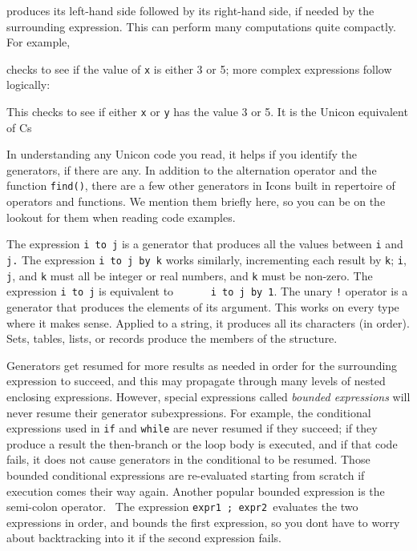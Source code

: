 
\noindent
produces its left-hand side followed by its right-hand side, if needed
by the surrounding expression. This can perform many computations quite
compactly. For example,


checks to see if the value of \texttt{x} is either 3 or 5; more complex
expressions follow logically:


This checks to see if either \texttt{x} or \texttt{y} has the value 3 or
5. It is the Unicon equivalent of C{\textquotesingle}s


In understanding any Unicon code you read, it helps if you identify the
generators, if there are any. In addition to the alternation operator
\texttt{{\textbar}} and the function \texttt{find()}, there are a few
other generators in Icon{\textquotesingle}s built in repertoire of
operators and functions. We mention them briefly here, so you can be on
the lookout for them when reading code examples.

The expression \texttt{i }\texttt{to j} is a
generator that produces all the values between \texttt{i} and
\texttt{j.} The expression \texttt{i to j }\texttt{by k} works similarly, incrementing each result by
\texttt{k}; \texttt{i}, \texttt{j}, and \texttt{k} must all be integer
or real numbers, and \texttt{k} must be non-zero. The expression
\texttt{i to j} is equivalent to \ \ \ \ \ \ \texttt{i to j by 1}. The
unary \texttt{!} operator is a generator
that produces the elements of its argument. This works on every type
where it makes sense. Applied to a string, it produces all its
characters (in order). Sets, tables, lists, or records produce the
members of the structure.

Generators get resumed for more results as needed in order for the
surrounding expression to succeed, and this may propagate through many
levels of nested enclosing expressions. However, special expressions
called \textit{bounded expressions} will
never resume their generator subexpressions. For example, the
conditional expressions used in \texttt{if} and \texttt{while} are
never resumed if they succeed; if they produce a result the then-branch
or the loop body is executed, and if that code fails, it does not cause
generators in the conditional to be resumed. Those bounded conditional
expressions are re-evaluated starting from scratch if execution comes
their way again. Another popular bounded expression is the semi-colon
operator. \ The expression \texttt{expr1 ; expr2 }evaluates the two
expressions in order, and bounds the first expression, so you
don{\textquotesingle}t have to worry about backtracking into it if the
second expression fails.

